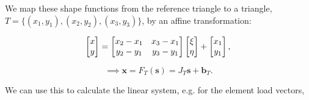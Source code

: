 \documentclass[12pt, a4paper]{article}
\renewcommand{\vec}[1]{\mathbf{#1}}
\theoremstyle{definition}
\theoremstyle{remark}
\numberwithin{equation}{section}
\begin{document}
We map these shape functions from the reference triangle to a triangle, \mbox{$T=\{(x_1,y_1),(x_2,y_2),(x_3,y_3)\}$}, by an affine transformation:


\begin{equation*}
\begin{bmatrix}
x\\
y
\end{bmatrix}
=
\begin{bmatrix}
x_2-x_1 & x_3-x_1\\
y_2-y_1 & y_3-y_1
\end{bmatrix}
\begin{bmatrix}
\xi\\
\eta
\end{bmatrix}
+
\begin{bmatrix}
x_1\\
y_1
\end{bmatrix},\\
\end{equation*}


\begin{equation*}
\implies \vec{x}=F_T(\vec{s}) ={J}_T\vec{s} +  \vec{b}_T.
\end{equation*}

We can use this to calculate the linear system, e.g. for the element load vectors,
\end{document}
